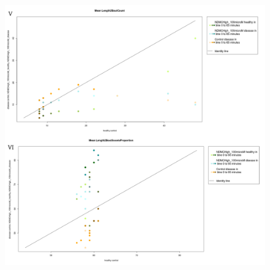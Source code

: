 \begin{figure}[h!]
\begin{center}
\includegraphics[width=15cm,height=16cm]{ApoHighCountScootsN.png}
\end{center}
\end{figure}



